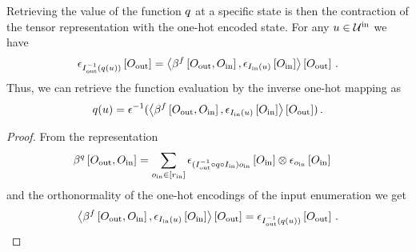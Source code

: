 \begin{theorem}
    \label{the:basisCalculus}
    Retrieving the value of the function $q$ at a specific state is then the contraction of the tensor representation with the one-hot encoded state.
    For any $u\in\mathcal{U}^{\mathrm{in}}$ we have
    \begin{align*}
        \epsilon_{I_{\mathrm{out}}^{-1}(q(u))}\left[O_{\mathrm{out}}\right]
        = \left\langle 
            \beta^{f}\left[O_{\mathrm{out}},O_{\mathrm{in}}\right],
            \epsilon_{I_{\mathrm{in}}(u)}\left[O_{\mathrm{in}}\right]
        \right\rangle \left[ O_{\mathrm{out}} \right] \, .
    \end{align*}
    Thus, we can retrieve the function evaluation by the inverse one-hot mapping as
    \begin{align*}
        q(u) = \epsilon^{-1}(\left\langle 
            \beta^{f}\left[O_{\mathrm{out}},O_{\mathrm{in}}\right],
            \epsilon_{I_{\mathrm{in}}(u)}\left[O_{\mathrm{in}}\right]
        \right\rangle \left[ O_{\mathrm{out}} \right]) \, .
    \end{align*}
\end{theorem}
\begin{proof}
    From the representation
    \begin{align*}
        \beta^{q}\left[O_{\mathrm{out}},O_{\mathrm{in}}\right]
        & =  \sum_{o_{\mathrm{in}}\in[r_{\mathrm{in}}]}
        \epsilon_{(I_{\mathrm{out}}^{-1} \circ q \circ I_{\mathrm{in}}) o_{\mathrm{in}}
        }\left[O_{\mathrm{in}}\right]
        \otimes
        \epsilon_{o_{\mathrm{in}}}\left[O_{\mathrm{in}}\right]
    \end{align*}
    and the orthonormality of the one-hot encodings of the input enumeration we get
    \begin{align*}
        \left\langle 
            \beta^{f}\left[O_{\mathrm{out}},O_{\mathrm{in}}\right],
            \epsilon_{I_{\mathrm{in}}(u)}\left[O_{\mathrm{in}}\right]
        \right\rangle \left[ O_{\mathrm{out}} \right]
        = \epsilon_{I_{\mathrm{out}}^{-1}(q(u))}\left[O_{\mathrm{out}}\right] \, .
    \end{align*}
\end{proof}

